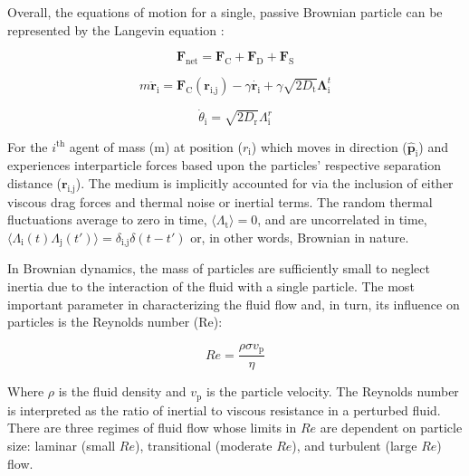 \documentclass[11pt]{article}
\begin{document}
Overall, the equations of motion for a single, passive Brownian particle can be represented by the Langevin equation \cite{Lowen, Schweitzer}: 

\begin{equation}\label{1newact}
    \boldsymbol{F}_{\text{net}}=\boldsymbol{F}_{\text{C}}+\boldsymbol{F}_{\text{D}}+\boldsymbol{F}_{\text{S}}
\end{equation}

\begin{equation}\label{phi}
    m\boldsymbol{\ddot{r}}_\text{i} = \boldsymbol{F}_{\text{C}}(\boldsymbol{r}_{\text{i,j}})-\gamma \dot{\boldsymbol{r}_{\text{i}}}+\gamma\sqrt{2D_\text{t}}\boldsymbol{\Lambda}^t_\text{i}
\end{equation}

\begin{equation}\label{phi2}
    \dot{\theta}_{\text{i}} = \sqrt{2D_\text{r}}\Lambda^r_\text{i}
\end{equation}

\noindent For the $i^{\text{th}}$ agent of mass (m) at position ($r_{\text{i}}$) which moves in direction ($\boldsymbol{\hat{p}}_\text{i}$) and experiences interparticle forces based upon the particles’ respective separation distance ($\boldsymbol{r}_{\text{i,j}}$).  The medium is implicitly accounted for via the inclusion of either viscous drag forces and thermal noise or inertial terms.  The random thermal fluctuations average to zero in time, $\langle\Lambda_\text{t}\rangle=0$, and are uncorrelated in time, $\langle\Lambda_\text{i}(t)\Lambda_\text{j}(t')\rangle=\delta_{\text{i,j}}\delta(t-t')$ or, in other words, Brownian in nature.  

In Brownian dynamics, the mass of particles are sufficiently small to neglect inertia due to the interaction of the fluid with a single particle.  The most important parameter in characterizing the fluid flow and, in turn, its influence on particles is the Reynolds number (Re): 

\begin{equation}\label{equalRate}
    Re=\frac{\rho\sigma v_{\text{p}}}{\eta}
\end{equation}

\noindent Where $\rho$ is the fluid density and $v_\text{p}$ is the particle velocity. The Reynolds number is interpreted as the ratio of inertial to viscous resistance in a perturbed fluid.  There are three regimes of fluid flow whose limits in $Re$ are dependent on particle size: laminar (small $Re$), transitional (moderate $Re$), and turbulent (large $Re$) flow.  
\end{document}
